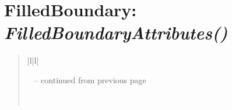 \documentclass[letterpaper,10pt,english]{sphinxmanual}
\begin{document}
\section{\textbf{FilledBoundary}: \emph{FilledBoundaryAttributes()}}
\label{attributes:filledboundary-filledboundaryattributes}
\begin{DUlineblock}{0em}
\item[] 
\end{DUlineblock}
\begin{quote}

\begin{longtable}{|l|l|}
\hline
\endfirsthead

%
{{\textsf{\tablename\ \thetable{} -- continued from previous page}}} \\
\hline
\endhead

\hline {} \\ \hline
\endfoot

\endlastfoot



\end{longtable}
\end{quote}
\end{document}
